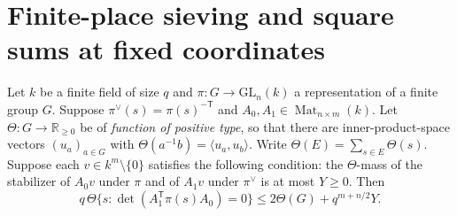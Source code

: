 \section{Finite-place sieving and square sums at fixed coordinates}
\label{sec:b-finite-sieve}

\begin{lemma}
\label{lem:b-positive-type-determinant}
\emitthmsource
Let $k$ be a finite field of size $q$ and $\pi:G\to\mathrm{GL}_n(k)$ a representation of a finite group $G$.
Suppose $\pi^\vee(s)=\pi(s)^{-{\mathsf T}}$ and $A_0,A_1\in\operatorname{Mat}_{n\times m}(k)$.
Let $\Theta:G\to\mathbb R_{\ge0}$ be of \emph{function of positive type}, so that there are inner-product-space vectors $(u_a)_{a\in G}$ with
$\Theta(a^{-1}b)=\langle u_a,u_b\rangle$.
Write $\Theta(E)=\sum_{s\in E}\Theta(s)$. Suppose each $v\in k^m\setminus\{0\}$ satisfies the following condition:
the $\Theta$-mass of the stabilizer of $A_0v$ under $\pi$ and of $A_1v$ under $\pi^\vee$ is at most $Y\ge0$. Then
\[
 q\,\Theta\{s:\det(A_1^{\mathsf T}\pi(s)A_0)=0\}
 \le 2\Theta(G)+q^{m+n/2}Y.
\]
\end{lemma}
